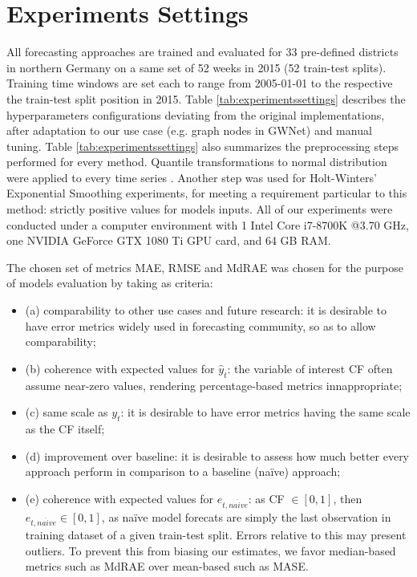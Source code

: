 \chapter{Experiments Settings}\label{chap:experiments}
All forecasting approaches are trained and evaluated for 33 pre-defined districts in northern Germany on a same set of 52 weeks in 2015 (52 train-test splits).
Training time windows are set each to range from 2005-01-01 to the respective the train-test split position in 2015.
Table \ref{tab:experimentssettings} describes the hyperparameters configurations deviating from the original implementations, after adaptation to our use case (e.g. graph nodes in GWNet) and manual tuning.
Table \ref{tab:experimentssettings} also summarizes the preprocessing steps performed for every method.
Quantile transformations to normal distribution were applied to every time series \cite{sklearn2020qtransformation}.
Another step was used for Holt-Winters' Exponential Smoothing experiments, for meeting a requirement particular to this method: strictly positive values for models inputs.
All of our experiments were conducted under a computer environment with 1 Intel Core i7-8700K @3.70 GHz, one NVIDIA GeForce GTX 1080 Ti GPU card, and 64 GB RAM.

The chosen set of metrics MAE, RMSE and MdRAE was chosen for the purpose of models evaluation by taking as criteria:
\begin{itemize}
    \item (a) comparability to other use cases and future research: it is desirable to have error metrics widely used in forecasting community, so as to allow comparability;
    \item (b) coherence with expected values for $\hat{y}_t$: the variable of interest CF often assume near-zero values, rendering percentage-based metrics innappropriate;
    \item (c) same scale as $y_t$: it is desirable to have error metrics having the same scale as the CF itself;
    \item (d) improvement over baseline: it is desirable to assess how much better every approach perform in comparison to a baseline (naïve) approach;
    \item (e) coherence with expected values for $e_{t, na\ddot{i}ve}$: as CF $\in [0, 1]$, then $e_{t, na\ddot{i}ve} \in [0, 1]$, as naïve model forecats are simply the last observation in training dataset of a given train-test split.
    Errors relative to this may present outliers.
    To prevent this from biasing our estimates, we favor median-based metrics such as MdRAE over mean-based such as MASE.
\end{itemize}

